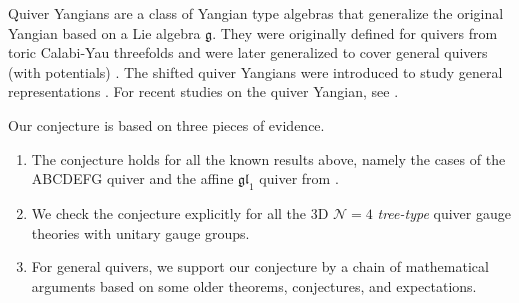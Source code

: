 \documentclass[12pt,a4paper]{article}
\renewcommand{\(}{\left(}
\renewcommand{\)}{\right)}
\renewcommand{\(}{\left(}
\renewcommand{\)}{\right)}
\begin{document}
Quiver Yangians are a class of Yangian type algebras that generalize the original Yangian based on a Lie algebra $\mathfrak{g}$.
They were originally defined for quivers from toric Calabi-Yau threefolds \cite{Li:2020rij,Yamazaki:2022cdg} and were later generalized to cover general quivers (with potentials) \cite{Li:2023zub}.
The shifted quiver Yangians were introduced to study general representations \cite{Galakhov:2021xum,Li:2023zub}. For recent studies on the quiver Yangian, see \cite{Galakhov:2020vyb,Galakhov:2021vbo,Bao:2022fpk,Bao:2022jhy,Bao:2023ece,Galakhov:2023mpc,Galakhov:2024bzs}.

\medskip

Our conjecture is based on three pieces of evidence.
\begin{enumerate}
\item The conjecture holds for all the known results above, namely the cases of the ABCDEFG quiver and the affine $\mathfrak{gl}_1$ quiver from \cite{Braverman:2016pwk,Kodera:2016faj_jordan_quiver,Nakajima:2019olw}.
\item We check the conjecture explicitly for all the 3D $\mathcal{N}=4$ \textit{tree-type} quiver gauge theories with unitary gauge groups.
\item For general quivers, we support our conjecture by a chain of  mathematical arguments based on some older theorems, conjectures, and expectations.
\end{enumerate}
\end{document}
